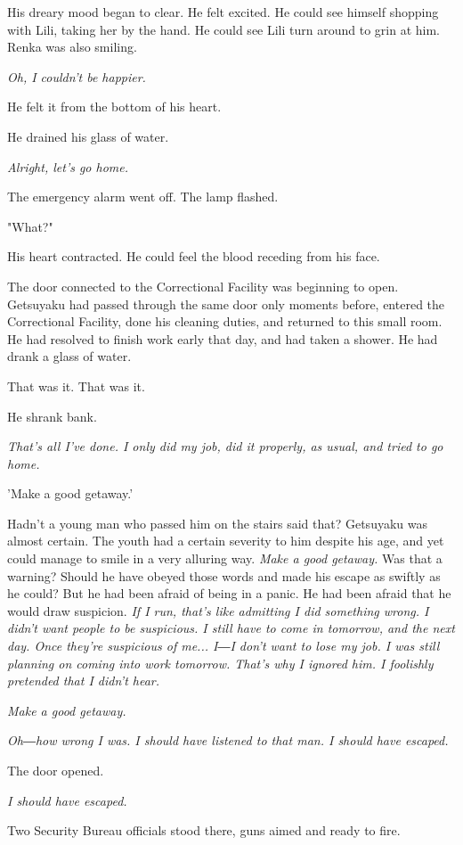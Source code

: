 His dreary mood began to clear. He felt excited. He could see himself
shopping with Lili, taking her by the hand. He could see Lili turn
around to grin at him. Renka was also smiling.

\emph{Oh, I couldn't be happier.}

He felt it from the bottom of his heart.

He drained his glass of water.

\emph{Alright, let's go home.}

The emergency alarm went off. The lamp flashed.

"What?"

His heart contracted. He could feel the blood receding from his face.

The door connected to the Correctional Facility was beginning to open.
Getsuyaku had passed through the same door only moments before, entered
the Correctional Facility, done his cleaning duties, and returned to
this small room. He had resolved to finish work early that day, and had
taken a shower. He had drank a glass of water.

That was it. That was it.

He shrank bank.

\emph{That's all I've done. I only did my job, did it properly, as usual, and
tried to go home.}

'Make a good getaway.'

Hadn't a young man who passed him on the stairs said that? Getsuyaku was
almost certain. The youth had a certain severity to him despite his age,
and yet could manage to smile in a very alluring way. \emph{Make a good
getaway.} Was that a warning? Should he have obeyed those words and made
his escape as swiftly as he could? But he had been afraid of being in a
panic. He had been afraid that he would draw suspicion. \emph{If I run, that's
like admitting I did something wrong. I didn't want people to be
suspicious. I still have to come in tomorrow, and the next day. Once
they're suspicious of me... I―I don't want to lose my job. I was still
planning on coming into work tomorrow. That's why I ignored him. I
foolishly pretended that I didn't hear.}

\emph{Make a good getaway.}

\emph{Oh―how wrong I was. I should have listened to that man. I should have
escaped.}

The door opened.

\emph{I should have escaped.}

Two Security Bureau officials stood there, guns aimed and ready to fire.

